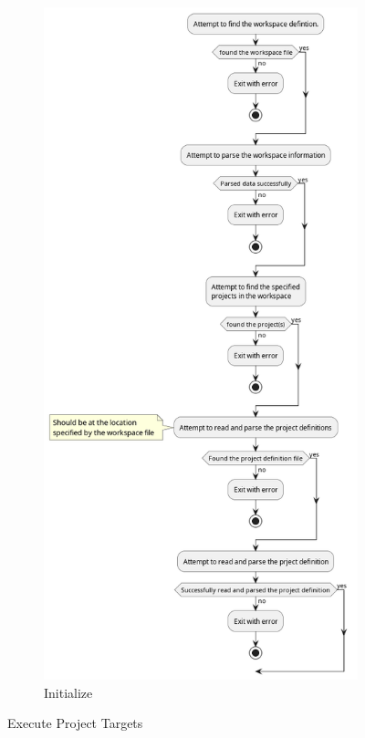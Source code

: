 \documentclass[11pt]{article}
\begin{document}
\begin{figure}[htbp]
\begin{minipage}{0.5\textwidth}
\begin{subfigure}[b]{\linewidth}
      \includegraphics[width=\linewidth]{diags/activity_001.png}
      \caption{Initialize}
    \end{subfigure}
  \end{minipage}

  \caption{\label{fig:act_exec}Execute Project Targets}
\end{figure}
\end{document}
